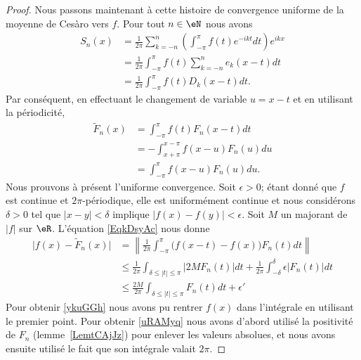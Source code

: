 \begin{proof}
	Nous passons maintenant à cette histoire de convergence uniforme de la moyenne de Cesàro vers \( f\). Pour tout \( n\in \eN\) nous avons
	\begin{subequations}
		\begin{align}
			S_n(x) & =\frac{1}{ 2\pi }\sum_{k=-n}^n\left( \int_{-\pi}^{\pi}f(t) e^{-ikt}dt \right) e^{ikx} \\
			       & =\frac{1}{ 2\pi }\int_{-\pi}^{\pi}f(t)\sum_{k=-n}^ne_k(x-t)dt                         \\
			       & =\frac{1}{ 2\pi }\int_{-\pi}^{\pi}f(t)D_k(x-t)dt.
		\end{align}
	\end{subequations}
	Par conséquent, en effectuant le changement de variable \( u=x-t\) et en utilisant la périodicité,
	\begin{subequations}    \label{EqkDsyAc}
		\begin{align}
			\tilde F_n(x) & =\int_{-\pi}^{\pi}f(t)F_n(x-t)dt     \\
			              & =-\int_{x+\pi}^{x-\pi}f(x-u)F_n(u)du \\
			              & =\int_{-\pi}^{\pi}f(x-u) F_n(u)du.
		\end{align}
	\end{subequations}
	Nous prouvons à présent l'uniforme convergence. Soit \( \epsilon>0\); étant donné que \( f\) est continue et \( 2\pi\)-périodique, elle est uniformément continue et nous considérons \( \delta>0\) tel que \( | x-y |<\delta\) implique \( \big| f(x)-f(y) \big|<\epsilon\). Soit \( M\) un majorant de \( | f |\) sur \( \eR\). L'équation \eqref{EqkDsyAc} nous donne
	\begin{subequations}
		\begin{align}
			\big| f(x)-\tilde F_n(x) \big| & =\left\| \frac{1}{ 2\pi }\int_{-\pi}^{\pi}\big( f(x-t)-f(x) \big)F_n(t)dt \right\|    \label{ykuGGh}                         \\
			                               & \leq\frac{1}{ 2\pi }\int_{\delta\leq| t |\leq \pi}| 2MF_n(t) |dt+\frac{1}{ 2\pi }\int_{-\delta}^{\delta}\epsilon| F_n(t) |dt \\
			                               & \leq\frac{ 2M }{ 2\pi }\int_{\delta\leq | t |\leq\pi}F_n(t)dt+\epsilon'     \label{uRAMyq}
		\end{align}
	\end{subequations}
	Pour obtenir \eqref{ykuGGh} nous avons pu rentrer \( f(x)\) dans l'intégrale en utilisant le premier point. Pour obtenir \eqref{uRAMyq} nous avons d'abord utilisé la positivité de \( F_n\) (lemme~\ref{LemtCAjJz}) pour enlever les valeurs absolues, et nous avons ensuite utilisé le fait que son intégrale valait \( 2\pi\).


\end{proof}
